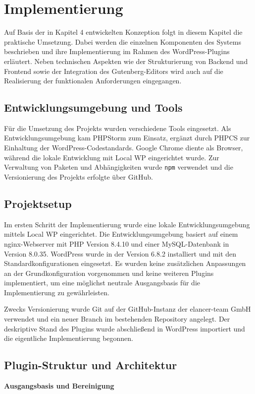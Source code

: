 \chapter{Implementierung}
\label{chap:implementation}
Auf Basis der in Kapitel 4 entwickelten Konzeption folgt in diesem Kapitel die praktische Umsetzung.
Dabei werden die einzelnen Komponenten des Systems beschrieben und ihre Implementierung im Rahmen des WordPress-Plugins erläutert.
Neben technischen Aspekten wie der Strukturierung von Backend und Frontend sowie der Integration des Gutenberg-Editors wird auch auf die Realisierung der funktionalen Anforderungen eingegangen.

\section{Entwicklungsumgebung und Tools}
Für die Umsetzung des Projekts wurden verschiedene Tools eingesetzt.
Als Entwicklungsumgebung kam PHPStorm zum Einsatz, ergänzt durch PHPCS zur Einhaltung der WordPress-Codestandards.
Google Chrome diente als Browser, während die lokale Entwicklung mit Local WP eingerichtet wurde.
Zur Verwaltung von Paketen und Abhängigkeiten wurde \texttt{npm} verwendet und die Versionierung des Projekts erfolgte über GitHub.

\section{Projektsetup}
Im ersten Schritt der Implementierung wurde eine lokale Entwicklungsumgebung mittels Local WP eingerichtet.
Die Entwicklungsumgebung basiert auf einem nginx-Webserver mit PHP Version 8.4.10 und einer MySQL-Datenbank in Version 8.0.35.
WordPress wurde in der Version 6.8.2 installiert und mit den Standardkonfigurationen eingesetzt.
Es wurden keine zusätzlichen Anpassungen an der Grundkonfiguration vorgenommen und keine weiteren Plugins implementiert, um eine möglichst neutrale Ausgangsbasis für die Implementierung zu gewährleisten.

Zwecks Versionierung wurde Git auf der GitHub-Instanz der elancer-team GmbH verwendet und ein neuer Branch im bestehenden Repository angelegt.
Der deskriptive Stand des Plugins wurde abschließend in WordPress importiert und die eigentliche Implementierung begonnen.

\section{Plugin-Struktur und Architektur}
\textbf{Ausgangsbasis und Bereinigung}

